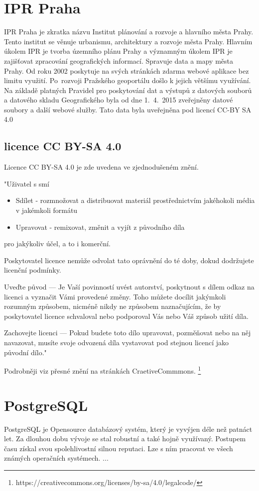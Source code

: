 \section{IPR Praha}
\label{IPR Praha}
IPR Praha je zkratka názvu Institut plánování a rozvoje a hlavního města Prahy. 
Tento institut se věnuje urbanismu, architektury a rozvoje města Prahy. Hlavním
úkolem IPR je tvorba územního plánu Prahy a významným úkolem IPR je zajišťovat
zpracování geografických informací. Spravuje data a mapy města Prahy. Od roku 
2002 poskytuje na svých stránkách zdarma webové aplikace bez limitu využití. 
Po~rozvoji Pražského geoportálu došlo k jejich většímu využívání.  Na základě 
platných Pravidel pro poskytování dat a  výstupů z datových souborů a datového 
skladu Geografického byla od dne 1.~4.~2015 zveřejněny datové soubory a další 
webové služby. Tato data byla uveřejněna pod licencí CC-BY SA 4.0 \cite{IPR}
\subsection{licence CC BY-SA 4.0}
\label{licence CC BY-SA 4.0}
Licence CC BY-SA 4.0 je zde uvedena ve zjednodušeném znění.

"Uživatel s smí
\begin{itemize}
    \item   Sdílet - rozmnožovat a distribuovat materiál prostřednictvím jakéhokoli média v jakémkoli formátu
    \item   Upravovat - remixovat, změnit a vyjít z původního díla
\end{itemize}
pro jakýkoliv účel, a to i komerční.

Poskytovatel licence nemůže odvolat tato oprávnění do té doby, dokud dodržujete licenční podmínky.

Uveďte původ — Je Vaší povinností uvést autorství, poskytnout s dílem odkaz na licenci a vyznačit Vámi provedené změny. Toho můžete docílit jakýmkoli rozumným způsobem, nicméně nikdy ne způsobem naznačujícím, že by poskytovatel licence schvaloval nebo podporoval Vás nebo Váš způsob užití díla.

Zachovejte licenci — Pokud budete toto dílo upravovat, pozměňovat nebo na něj navazovat, musíte svoje odvozená díla vystavovat pod stejnou licencí jako původní dílo."

Podrobněji viz přesné znění na stránkách CraetiveCommmons.
\footnote{https://creativecommons.org/licenses/by-sa/4.0/legalcode/}


\section{PostgreSQL}
\label{PostgreSQL}
PostgreSQL je Opensource databázový systém, který je vyvýjen déle než patnáct
let. Za dlouhou dobu vývoje se stal robustní a také hojně využívaný.
Postupem času získal svou spolehlivostní silnou reputaci.
Lze s ním pracovat ve všech známých operačních systémech. 
...
\cite{PostgreSQL}

